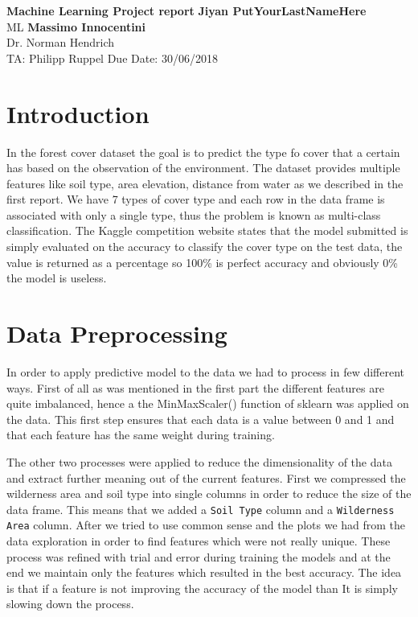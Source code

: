 \documentclass[a4paper, 11pt]{article}
\begin{document}
\noindent
\large\textbf{Machine Learning Project report} \hfill \textbf{Jiyan PutYourLastNameHere} \\
\normalsize ML \hfill \textbf{Massimo Innocentini} \\
Dr. Norman Hendrich \\
TA: Philipp Ruppel \hfill Due Date: 30/06/2018

\section*{Introduction}
In the forest cover dataset the goal is to predict the type fo cover that a certain has based on the observation of the environment. The dataset provides multiple features like soil type, area elevation, distance from water as we described in the first report. We have 7 types of cover type and each row in the data frame is associated with only a single type, thus the problem is known as multi-class classification. The Kaggle competition website states that the model submitted is simply evaluated on the accuracy to classify the cover type on the test data, the value is returned as a percentage so 100\% is perfect accuracy and obviously 0\% the model is useless.

\section*{Data Preprocessing}
In order to apply predictive model to the data we had to process in few different ways. First of all as was mentioned in the first part the different features are quite imbalanced, hence a the MinMaxScaler() function of sklearn was applied on the data. This first step ensures that each data is a value between 0 and 1 and that each feature has the same weight during training.

The other two processes were applied to reduce the dimensionality of the data and extract further meaning out of the current features.  First we compressed the wilderness area and soil type into single columns \cite{skill} in order to reduce the size of the data frame. This means that we added a \texttt{Soil Type} column and a \texttt{Wilderness Area} column. After we tried to use common sense and the plots we had from the data exploration in order to find features which were not really unique. These process was refined with trial and error during training the models and at the end we maintain only the features which resulted in the best accuracy. The idea is that if a feature is not improving the accuracy of the model than It is simply slowing down the process.
\end{document}
